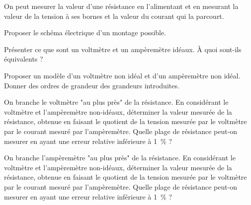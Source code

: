 

On peut mesurer la valeur d'une résistance en l'alimentant et en mesurant la valeur de la tension à ses bornes et la valeur du courant qui la parcourt.

\question Proposer le schéma électrique d'un montage possible.

\question Présenter ce que sont un voltmètre et un ampèremètre idéaux. À quoi sont-ils équivalents ?

\question Proposer un modèle d'un voltmètre non idéal et d'un ampèremètre non idéal. Donner des ordres de grandeur des grandeurs introduites.

\question On branche le voltmètre "au plus près" de la résistance.
\subquestion En considérant le voltmètre et l'ampèremètre non-idéaux, déterminer la valeur mesurée de la résistance, obtenue en faisant le quotient de la tension mesurée par le voltmètre par le courant mesuré par l'ampèremètre.
\subquestion Quelle plage de résistance peut-on mesurer en ayant une erreur relative inférieure à \SI{1}{\%} ?

\question On branche l'ampèremètre "au plus près" de la résistance.
\subquestion En considérant le voltmètre et l'ampèremètre non-idéaux, déterminer la valeur mesurée de la résistance, obtenue en faisant le quotient de la tension mesurée par le voltmètre par le courant mesuré par l'ampèremètre.
\subquestion Quelle plage de résistance peut-on mesurer en ayant une erreur relative inférieure à \SI{1}{\%} ?
